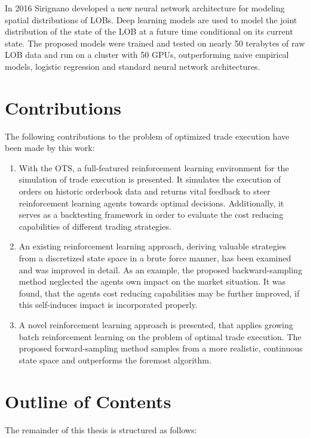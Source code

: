 In 2016 Sirignano \Cite{2016arXiv160101987S} developed a new neural network architecture for modeling spatial distributions of \ac{LOB}s. Deep learning models are used to model the joint distribution of the state of the \ac{LOB} at a future time conditional on its current state. The proposed models were trained and tested on nearly 50 terabytes of raw \ac{LOB} data and run on a cluster with 50 GPUs, outperforming naive empirical models, logistic regression and standard neural network architectures.




\section{Contributions}
\label{sec:contributions}
The following contributions to the problem of optimized trade execution have been made by this work:
\begin{enumerate}
\item With the \ac{OTS}, a full-featured reinforcement learning environment for the simulation of trade execution is presented. It simulates the execution of orders on historic orderbook data and returns vital feedback to steer reinforcement learning agents towards optimal decisions. Additionally, it serves as a backtesting framework in order to evaluate the cost reducing capabilities of different trading strategies.

\item An existing reinforcement learning approach, deriving valuable strategies from a discretized state space in a brute force manner, has been examined and was improved in detail. As an example, the proposed backward-sampling method neglected the agents own impact on the market situation. It was found, that the agents cost reducing capabilities may be further improved, if this self-induces impact is incorporated properly.

\item A novel reinforcement learning approach is presented, that applies growing batch reinforcement learning on the problem of optimal trade execution. The proposed forward-sampling method samples from a more realistic, continuous state space and outperforms the foremost algorithm.

\end{enumerate}

\section{Outline of Contents}
\label{sec:outline}
The remainder of this thesis is structured as follows:

